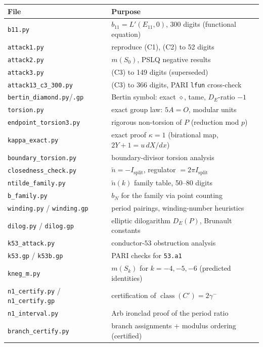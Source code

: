 \documentclass[11pt]{amsart}
\theoremstyle{definition}
\theoremstyle{remark}
\DeclareMathOperator{\class}{class}
\begin{document}
\begin{center}
\scriptsize
\begin{tabular}{@{}ll@{}}
\toprule
File & Purpose\\
\midrule
\texttt{b11.py} & $b_{11}=L'(E_{11},0)$, 300 digits (functional equation)\\
\texttt{attack1.py} & reproduce (C1), (C2) to 52 digits\\
\texttt{attack2.py} & $m(S_0)$, PSLQ negative results\\
\texttt{attack3.py} & (C3) to 149 digits (superseded)\\
\texttt{attack13\_c3\_300.py} & (C3) to 366 digits, PARI \texttt{lfun} cross-check\\
\texttt{bertin\_diamond.py}/\texttt{.gp} & Bertin symbol: exact $\diamond$, tame, $D_E$-ratio $-1$\\
\texttt{torsion.py} & exact group law: $5A=O$, modular units\\
\texttt{endpoint\_torsion3.py} & rigorous non-torsion of $P$ (reduction mod $p$)\\
\texttt{kappa\_exact.py} & exact proof $\kappa=1$ (birational map, $2Y+1=u\,dX/dx$)\\
\texttt{boundary\_torsion.py} & boundary-divisor torsion analysis\\
\texttt{closedness\_check.py} & $\tilde n=-I_{\mathrm{split}}$, regulator $=2\pi I_{\mathrm{split}}$\\
\texttt{ntilde\_family.py} & $\tilde n(k)$ family table, 50--80 digits\\
\texttt{b\_family.py} & $b_N$ for the family via point counting\\
\texttt{winding.py} / \texttt{winding.gp} & period pairings, winding-number heuristics\\
\texttt{dilog.py} / \texttt{dilog.gp} & elliptic dilogarithm $D_E(P)$, Brunault constants\\
\texttt{k53\_attack.py} & conductor-$53$ obstruction analysis\\
\texttt{k53.gp} / \texttt{k53b.gp} & PARI checks for \texttt{53.a1}\\
\texttt{kneg\_m.py} & $m(S_k)$ for $k=-4,-5,-6$ (predicted identities)\\
\texttt{n1\_certify.py} / \texttt{n1\_certify.gp} & certification of $\class(C')=2\gamma^-$\\
\texttt{n1\_interval.py} & Arb ironclad proof of the period ratio\\
\texttt{branch\_certify.py} & branch assignments + modulus ordering (certified)\\

\end{tabular}
\end{center}
\end{document}
